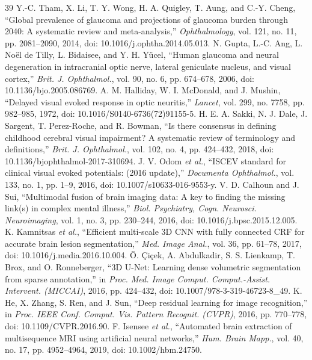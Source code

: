 \begin{thebibliography}{39}
Y.-C. Tham, X. Li, T. Y. Wong, H. A. Quigley, T. Aung, and C.-Y. Cheng, ``Global prevalence of glaucoma and projections of glaucoma burden through 2040: A systematic review and meta-analysis,'' \emph{Ophthalmology}, vol. 121, no. 11, pp. 2081--2090, 2014, doi: 10.1016/j.ophtha.2014.05.013.
N. Gupta, L.-C. Ang, L. No\"{e}l de Tilly, L. Bidaisee, and Y. H. Y\"{u}cel, ``Human glaucoma and neural degeneration in intracranial optic nerve, lateral geniculate nucleus, and visual cortex,'' \emph{Brit. J. Ophthalmol.}, vol. 90, no. 6, pp. 674--678, 2006, doi: 10.1136/bjo.2005.086769.
A. M. Halliday, W. I. McDonald, and J. Mushin, ``Delayed visual evoked response in optic neuritis,'' \emph{Lancet}, vol. 299, no. 7758, pp. 982--985, 1972, doi: 10.1016/S0140-6736(72)91155-5.
H. E. A. Sakki, N. J. Dale, J. Sargent, T. Perez-Roche, and R. Bowman, ``Is there consensus in defining childhood cerebral visual impairment? A systematic review of terminology and definitions,'' \emph{Brit. J. Ophthalmol.}, vol. 102, no. 4, pp. 424--432, 2018, doi: 10.1136/bjophthalmol-2017-310694.
J. V. Odom \emph{et al.}, ``ISCEV standard for clinical visual evoked potentials: (2016 update),'' \emph{Documenta Ophthalmol.}, vol. 133, no. 1, pp. 1--9, 2016, doi: 10.1007/s10633-016-9553-y.
V. D. Calhoun and J. Sui, ``Multimodal fusion of brain imaging data: A key to finding the missing link(s) in complex mental illness,'' \emph{Biol. Psychiatry, Cogn. Neurosci. Neuroimaging}, vol. 1, no. 3, pp. 230--244, 2016, doi: 10.1016/j.bpsc.2015.12.005.
K. Kamnitsas \emph{et al.}, ``Efficient multi-scale 3D CNN with fully connected CRF for accurate brain lesion segmentation,'' \emph{Med. Image Anal.}, vol. 36, pp. 61--78, 2017, doi: 10.1016/j.media.2016.10.004.
\"{O}. \c{C}i\c{c}ek, A. Abdulkadir, S. S. Lienkamp, T. Brox, and O. Ronneberger, ``3D U-Net: Learning dense volumetric segmentation from sparse annotation,'' in \emph{Proc. Med. Image Comput. Comput.-Assist. Intervent. (MICCAI)}, 2016, pp. 424--432, doi: 10.1007/978-3-319-46723-8\_49.
K. He, X. Zhang, S. Ren, and J. Sun, ``Deep residual learning for image recognition,'' in \emph{Proc. IEEE Conf. Comput. Vis. Pattern Recognit. (CVPR)}, 2016, pp. 770--778, doi: 10.1109/CVPR.2016.90.
F. Isensee \emph{et al.}, ``Automated brain extraction of multisequence MRI using artificial neural networks,'' \emph{Hum. Brain Mapp.}, vol. 40, no. 17, pp. 4952--4964, 2019, doi: 10.1002/hbm.24750.

\end{thebibliography}

